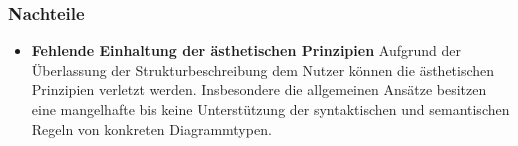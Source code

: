 \subsubsection{Nachteile}

\begin{itemize}

\item
\textbf{Fehlende Einhaltung der ästhetischen Prinzipien}
Aufgrund der Überlassung der Strukturbeschreibung dem Nutzer können die ästhetischen Prinzipien verletzt werden. Insbesondere die allgemeinen Ansätze besitzen eine mangelhafte bis keine Unterstützung der syntaktischen und semantischen Regeln von konkreten Diagrammtypen.

\end{itemize}
